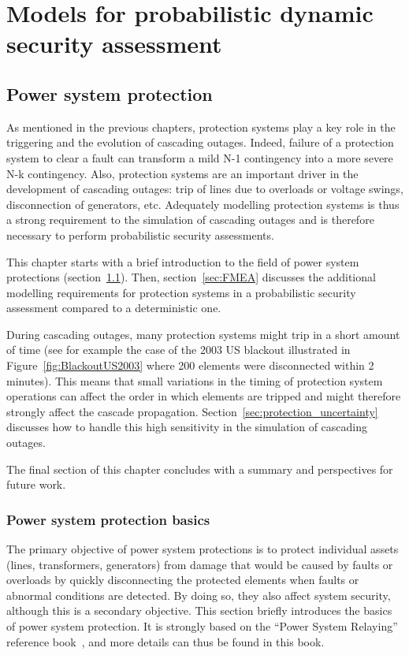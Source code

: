 \part{Models for probabilistic dynamic security assessment}
\label{part:models}
\chapter{Power system protection}
\label{ch:protections}
\minitoc

As mentioned in the previous chapters, protection systems play a key role in the triggering and the evolution of cascading outages. Indeed, failure of a protection system to clear a fault can transform a mild N-1 contingency into a more severe N-k contingency. Also, protection systems are an important driver in the development of cascading outages: trip of lines due to overloads or voltage swings, disconnection of generators, etc. Adequately modelling protection systems is thus a strong requirement to the simulation of cascading outages and is therefore necessary to perform probabilistic security assessments.

This chapter starts with a brief introduction to the field of power system protections (section~\ref{sec:protection_basics}). Then, section~\ref{sec:FMEA} discusses the additional modelling requirements for protection systems in a probabilistic security assessment compared to a deterministic one.

During cascading outages, many protection systems might trip in a short amount of time (see for example the case of the 2003 US blackout illustrated in Figure~\ref{fig:BlackoutUS2003} where 200 elements were disconnected within 2 minutes). This means that small variations in the timing of protection system operations can affect the order in which elements are tripped and might therefore strongly affect the cascade propagation. Section~\ref{sec:protection_uncertainty} discusses how to handle this high sensitivity in the simulation of cascading outages.

The final section of this chapter concludes with a summary and perspectives for future work.


\section{Power system protection basics}
\label{sec:protection_basics}

The primary objective of power system protections is to protect individual assets (lines, transformers, generators) from damage that would be caused by faults or overloads by quickly disconnecting the protected elements when faults or abnormal conditions are detected. By doing so, they also affect system security, although this is a secondary objective. This section briefly introduces the basics of power system protection. It is strongly based on the ``Power System Relaying'' reference book~\cite{HorowitzBook}, and more details can thus be found in this book.

